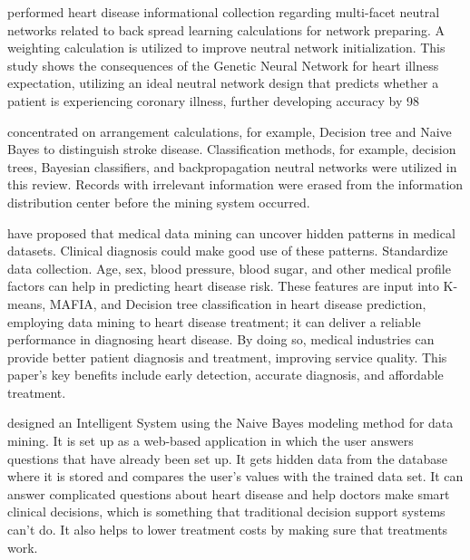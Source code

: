 {\citealp{waghulde2014genetic} performed heart disease informational collection regarding multi-facet neutral networks related to back spread learning calculations for network preparing. A weighting calculation is utilized to improve neutral network initialization. This study shows the consequences of the Genetic Neural Network for heart illness expectation, utilizing an ideal neutral network design that predicts whether a patient is experiencing coronary illness, further developing accuracy by 98%

\citealp{sudha2012effective} concentrated on arrangement calculations, for example, Decision tree and Naive Bayes to distinguish stroke disease. Classification methods, for example, decision trees, Bayesian classifiers, and backpropagation neutral networks were utilized in this review. Records with irrelevant information were erased from the information distribution center before the mining system occurred.



\citealp{babu2017heart}  have proposed that medical data mining can uncover hidden patterns in medical datasets. Clinical diagnosis could make good use of these patterns. Standardize data collection. Age, sex, blood pressure, blood sugar, and other medical profile factors can help in predicting heart disease risk. These features are input into K-means, MAFIA, and Decision tree classification in heart disease prediction, employing data mining to heart disease treatment; it can deliver a reliable performance in diagnosing heart disease. By doing so, medical industries can provide better patient diagnosis and treatment, improving service quality. This paper's key benefits include early detection, accurate diagnosis, and affordable treatment.


\citealp{pattekari2012prediction} designed an Intelligent System using the Naive Bayes modeling method for data mining. It is set up as a web-based application in which the user answers questions that have already been set up. It gets hidden data from the database where it is stored and compares the user's values with the trained data set. It can answer complicated questions about heart disease and help doctors make smart clinical decisions, which is something that traditional decision support systems can't do. It also helps to lower treatment costs by making sure that treatments work.

}
